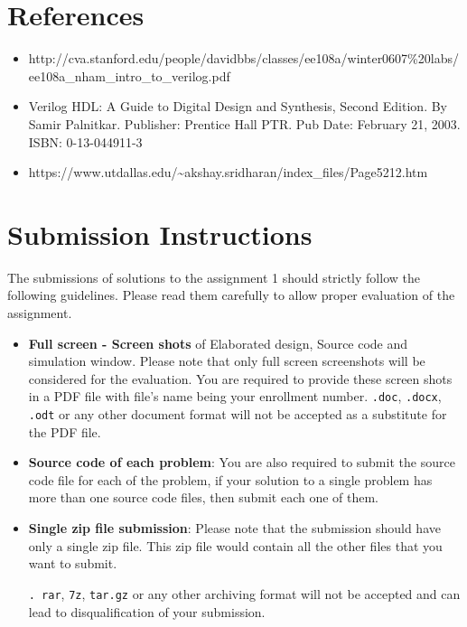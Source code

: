 \documentclass[a4paper,10pt]{article}
\theoremstyle{mytheor}
\begin{document}
\section*{References}
\begin{itemize}
  \small 
\item http://cva.stanford.edu/people/davidbbs/classes/ee108a/winter0607\%20labs/ee108a\_nham\_intro\_to\_verilog.pdf
\item Verilog HDL: A Guide to Digital Design and Synthesis, Second Edition. By Samir Palnitkar. Publisher: Prentice Hall PTR. Pub Date: February 21, 2003. ISBN: 0-13-044911-3
\item https://www.utdallas.edu/{\textasciitilde}akshay.sridharan/index\_files/Page5212.htm
\end{itemize}

\section*{Submission Instructions}
The submissions of solutions to the assignment 1 should strictly
follow the following guidelines. Please read them carefully to allow
proper evaluation of the assignment.

\begin{itemize}
\item \textbf{Full screen - Screen shots} of Elaborated design, Source
  code and simulation window. Please note that only full screen
  screenshots will be considered for the evaluation. You are required
  to provide these screen shots in a PDF file with file's name being
  your enrollment
  number. \lstinline[style=verilog-inline-style]{.doc},
  \lstinline[style=verilog-inline-style]{.docx},
  \lstinline[style=verilog-inline-style]{.odt} or any other document
  format will {\color{red}not} be accepted as a substitute for the PDF
  file.

\item \textbf{Source code of each problem}: You are also required to submit
the source code file for each of the problem, if your solution to a
single problem has more than one source code files, then submit each
one of them.

\item \textbf{Single zip file submission}: Please note that the
  submission should have only a single {\color{blue}zip} file. This
  zip file would contain all the other files that you want to submit.

  \lstinline[style=verilog-inline-style]{. rar},
  \lstinline[style=verilog-inline-style]{7z},
  \lstinline[style=verilog-inline-style]{tar.gz} or any other
  archiving format will {\color{red}not} be accepted and can lead to
  disqualification of your submission.
  
\end{itemize} 
\end{document}
